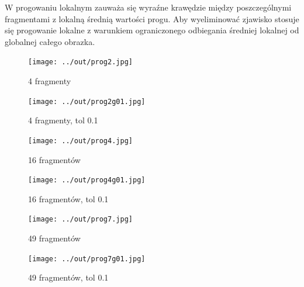 \documentclass[a4paper,12pt]{article}
\begin{document}
W progowaniu lokalnym zauważa się wyraźne krawędzie między poszczególnymi fragmentami z lokalną średnią wartości progu. Aby wyeliminować zjawisko stosuje się progowanie lokalne z warunkiem ograniczonego odbiegania średniej lokalnej od globalnej całego obrazka.



\newpage
\begin{figure}[h!]
\begin{minipage}[t]{7.5cm}
\begin{center}
\texttt{[image: ../out/prog2.jpg]}
\caption{4 fragmenty}
\end{center}
\end{minipage}
\hfill
\begin{minipage}[t]{7.5cm}
\begin{center}
\texttt{[image: ../out/prog2g01.jpg]}
\caption{4 fragmenty, tol 0.1}
\end{center}
\end{minipage}
\end{figure}

\begin{figure}[h!]
\begin{minipage}[t]{7.5cm}
\begin{center}
\texttt{[image: ../out/prog4.jpg]}
\caption{16 fragmentów}
\end{center}
\end{minipage}
\hfill
\begin{minipage}[t]{7.5cm}
\begin{center}
\texttt{[image: ../out/prog4g01.jpg]}
\caption{16 fragmentów, tol 0.1}
\end{center}
\end{minipage}
\end{figure}

\begin{figure}[h!]
\begin{minipage}[t]{7.5cm}
\begin{center}
\texttt{[image: ../out/prog7.jpg]}
\caption{49 fragmentów}
\end{center}
\end{minipage}
\hfill
\begin{minipage}[t]{7.5cm}
\begin{center}
\texttt{[image: ../out/prog7g01.jpg]}
\caption{49 fragmentów, tol 0.1}
\end{center}
\end{minipage}
\end{figure}
\end{document}
